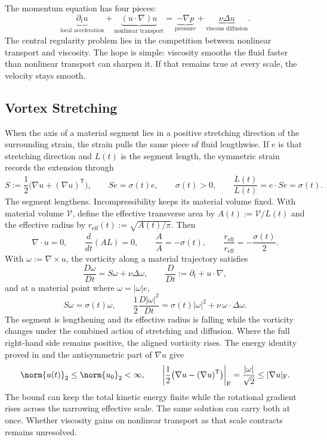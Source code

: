 
The momentum equation has four pieces:
\[
  \underbrace{\partial_t u}_{\text{local acceleration}}
  +
  \underbrace{(u\cdot\nabla)u}_{\text{nonlinear transport}}
  =
  \underbrace{-\nabla p}_{\text{pressure}}
  +
  \underbrace{\nu\Delta u}_{\text{viscous diffusion}}.
\]
The central regularity problem lies in the competition between nonlinear transport and viscosity.
The hope is simple: viscosity smooths the fluid faster than nonlinear transport can sharpen it.
If that remains true at every scale, the velocity stays smooth.

\subsection{Vortex Stretching}\label{sub:ThePerfectlyStretchingVortex}

When the axis of a material segment lies in a positive stretching direction of the surrounding strain, the strain pulls the same piece of fluid lengthwise. If \(e\) is that stretching direction and \(L(t)\) is the segment length, the symmetric strain records the extension through
\[
  S:=\frac12\bigl(\nabla u+(\nabla u)^{\mathsf T}\bigr),
  \qquad
  Se=\sigma(t)e,
  \qquad
  \sigma(t)>0,
  \qquad
  \frac{\dot L(t)}{L(t)}
  =
  e\cdot Se
  =
  \sigma(t).
\]
The segment lengthens. Incompressibility keeps its material volume fixed. With material volume \(\mathcal V\), define the effective transverse area by \(A(t):=\mathcal V/L(t)\) and the effective radius by \(r_{\mathrm{eff}}(t):=\sqrt{A(t)/\pi}\). Then
\[
  \nabla\cdot u=0,
  \qquad
  \frac{d}{dt}(A L)=0,
  \qquad
  \frac{\dot A}{A}=-\sigma(t),
  \qquad
  \frac{\dot r_{\mathrm{eff}}}{r_{\mathrm{eff}}}
  =
  -\frac{\sigma(t)}{2}.
\]
With \(\omega:=\nabla\times u\), the vorticity along a material trajectory satisfies
\[
  \frac{D\omega}{Dt}
  =
  S\omega+\nu\Delta\omega,
  \qquad
  \frac{D}{Dt}
  :=
  \partial_t+u\cdot\nabla,
\]
and at a material point where \(\omega=|\omega|e\),
\[
  S\omega
  =
  \sigma(t)\omega,
  \qquad
  \frac12\frac{D|\omega|^2}{Dt}
  =
  \sigma(t)|\omega|^2
  +
  \nu\,\omega\cdot\Delta\omega.
\]
The segment is lengthening and its effective radius is falling while the vorticity changes under the combined action of stretching and diffusion. Where the full right-hand side remains positive, the aligned vorticity rises. The energy identity proved in  and the antisymmetric part of \(\nabla u\) give
\[
  \norm{u(t)}_2
  \leq
  \norm{u_0}_2
  <\infty,
  \qquad
  \left|\frac12\bigl(\nabla u-(\nabla u)^{\mathsf T}\bigr)\right|_{\mathrm F}
  =
  \frac{|\omega|}{\sqrt2}
  \leq
  |\nabla u|_{\mathrm F}.
\]
The bound can keep the total kinetic energy finite while the rotational gradient rises across the narrowing effective scale. The same solution can carry both at once. Whether viscosity gains on nonlinear transport as that scale contracts remains unresolved.

